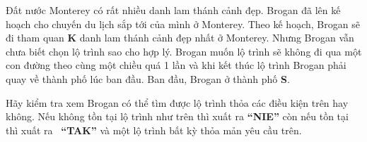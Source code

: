 Đất nước Monterey có rất nhiều danh lam thánh cảnh đẹp. Brogan đã lên kế hoạch cho chuyến du lịch sắp tới của mình ở Monterey. Theo kế hoạch, Brogan sẽ đi tham quan \textbf{K} danh lam thánh cảnh đẹp nhất ở Monterey. Nhưng Brogan vẫn chưa biết chọn lộ trình sao cho hợp lý. Brogan muốn lộ trình sẽ không đi qua một con đường theo cùng một chiều quá 1 lần và khi kết thúc lộ trình Brogan phải quay về thành phố lúc ban đầu. Ban đầu, Brogan ở thành phố \textbf{S}.

Hãy kiểm tra xem Brogan có thể tìm được lộ trình thỏa các điều kiện trên hay không. Nếu không tồn tại lộ trình như trên thì xuất ra \textbf{“NIE”} còn nếu tồn tại thì xuất ra  \textbf{“TAK”} và một lộ trình bất kỳ thỏa mản yêu cầu trên.